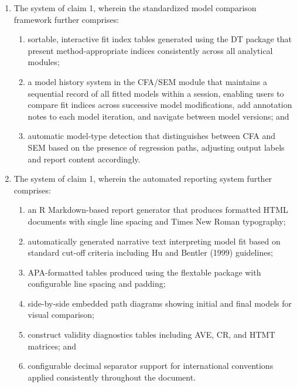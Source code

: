 \documentclass[12pt,a4paper]{article}
\begin{document}
\begin{enumerate}[leftmargin=3em, labelsep=1em, itemsep=12pt]
\item The system of claim 1, wherein the standardized model comparison framework further comprises:
\begin{enumerate}[label=\alph*., leftmargin=2em, itemsep=2pt]
\item sortable, interactive fit index tables generated using the DT package that present method-appropriate indices consistently across all analytical modules;
\item a model history system in the CFA/SEM module that maintains a sequential record of all fitted models within a session, enabling users to compare fit indices across successive model modifications, add annotation notes to each model iteration, and navigate between model versions; and
\item automatic model-type detection that distinguishes between CFA and SEM based on the presence of regression paths, adjusting output labels and report content accordingly.
\end{enumerate}

\item The system of claim 1, wherein the automated reporting system further comprises:
\begin{enumerate}[label=\alph*., leftmargin=2em, itemsep=2pt]
\item an R Markdown-based report generator that produces formatted HTML documents with single line spacing and Times New Roman typography;
\item automatically generated narrative text interpreting model fit based on standard cut-off criteria including Hu and Bentler (1999) guidelines;
\item APA-formatted tables produced using the flextable package with configurable line spacing and padding;
\item side-by-side embedded path diagrams showing initial and final models for visual comparison;
\item construct validity diagnostics tables including AVE, CR, and HTMT matrices; and
\item configurable decimal separator support for international conventions applied consistently throughout the document.
\end{enumerate}


\end{enumerate}
\end{document}

